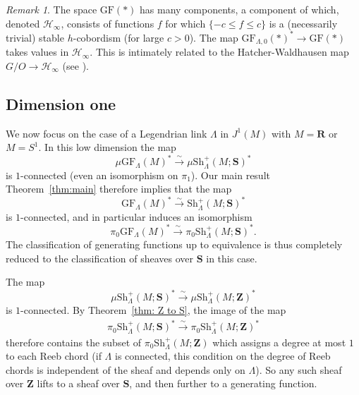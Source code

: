 \documentclass[12pt,a4paper]{article}
\numberwithin{equation}{section}
\theoremstyle{definition}
\theoremstyle{remark}
\newtheorem{remark}[equation]{Remark}
\newcommand{\Z}{\mathbf{Z}}
\newcommand{\HH}{\mathcal{H}}
\newcommand{\R}{\mathbf{R}}
\newcommand{\Sh}{\mathrm{Sh}}
\renewcommand{\S}{\mathbf{S}}
\newcommand{\GF}{\mathrm{GF}}
\begin{document}
\begin{remark}\label{rem:hatcherwaldhausen}
The space $\GF(\ast)$ has many components, a component of which, denoted $\HH_\infty$, consists of functions $f$ for which $\{-c\leq f\leq c\}$
is a (necessarily trivial) stable $h$-cobordism (for large $c>0$). The map $\GF_{\Lambda,0}(*)^*\to\GF(\ast)$ takes values in $\HH_\infty$.
This is intimately related to the Hatcher-Waldhausen map $G/O\to \HH_\infty$ (see \cite{kragh_HW_2018}).
\end{remark}

\subsection{Dimension one}

We now focus on the case of a Legendrian link $\Lambda$ in $J^1(M)$ with $M=\R$ or $M=S^1$.
In this low dimension the map
\begin{equation}\mu\GF_\Lambda(M)^*\overset{\sim}{\longrightarrow}  \mu\Sh_\Lambda^+(M;\S)^*
\end{equation}
is $1$-connected (even an isomorphism on $\pi_1$). Our main result Theorem~\ref{thm:main} therefore implies that the map
\begin{equation}
\GF_\Lambda(M)^*\overset{\sim}{\longrightarrow} \Sh_\Lambda^+(M;\S)^*
\end{equation}
is $1$-connected, and in particular induces an isomorphism
\begin{equation}
\pi_0\GF_\Lambda(M)^*\overset{\sim}{\longrightarrow} \pi_0\Sh_\Lambda^+(M;\S)^*.
\end{equation}
The classification of generating functions up to equivalence is thus completely reduced to the classification
of sheaves over $\S$ in this case.

The map
\begin{equation}\mu\Sh_\Lambda^+(M;\S)^*\overset{\sim}{\longrightarrow}  \mu\Sh_\Lambda^+(M;\Z)^*
\end{equation}
is $1$-connected.
By Theorem~\ref{thm: Z to S}, the image of the map
\begin{align}
\pi_0\Sh_\Lambda^+(M;\S)^*\overset{\sim}{\longrightarrow}  \pi_0\Sh_\Lambda^+(M;\Z)^*
\end{align}
therefore
contains the subset of $\pi_0\Sh_\Lambda^+(M;\Z)$ which assigns a degree at most $1$ to each Reeb chord
(if $\Lambda$ is connected, this condition on the degree of Reeb chords is independent of the sheaf and depends only on $\Lambda$).
So any such sheaf over $\Z$ lifts to a sheaf over $\S$, and then further to a generating function.
\end{document}
